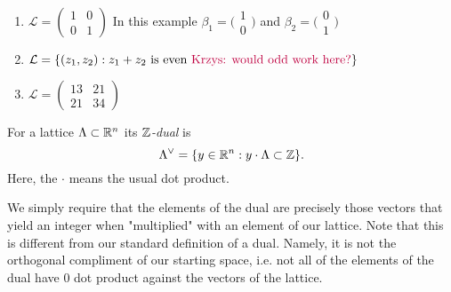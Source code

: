 \begin{example}
\begin{enumerate}
    \item $\mathcal{L} = \begin{pmatrix}
        1 & 0\\
        0 & 1
        \end{pmatrix}$ In this example $\beta_1 = \big(\begin{smallmatrix}
          1\\
          0
        \end{smallmatrix}\big)$ and $\beta_2 = \big(\begin{smallmatrix}
          0\\
          1
        \end{smallmatrix}\big)$
    \item $\mathcal{L} = \{(z_1,z_2) : z_1 + z_2 \text{ is even \textcolor{purple}{Krzys: would odd work here?}}\}$
    \item $\mathcal{L} = \begin{pmatrix}
        13 & 21\\
        21 & 34
        \end{pmatrix}$
\end{enumerate}
\end{example}

\begin{definition}[Dual]
    For a lattice $\Lambda \subset \mathbb{R}^n$ its $\mathbb{Z}$\textit{-dual} is
    $$ \Lambda^{\vee} = \{ y \in \mathbb{R}^n : y \cdot \Lambda \subset \mathbb{Z} \}.$$
    Here, the $\cdot$ means the usual dot product.
\end{definition}

We simply require that the elements of the dual are precisely those vectors that yield an integer when "multiplied" with an element of our lattice. Note that this is different from our standard definition of a dual. Namely, it is not the orthogonal compliment of our starting space, i.e. not all of the elements of the dual have 0 dot product against the vectors of the lattice.

